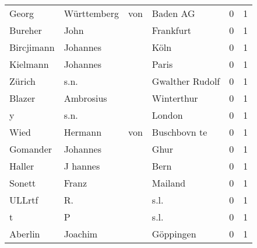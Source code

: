 \begin{center}
\begin{tiny}
\begin{longtabu}{llllrr}
                    Georg &                        Württemberg &         von &                                    Baden AG &          0 &         1 \\
                  Bureher &                               John &             &                                   Frankfurt &          0 &         1 \\
               Bircjimann &                           Johannes &             &                                        Köln &          0 &         1 \\
                 Kielmann &                           Johannes &             &                                       Paris &          0 &         1 \\
                   Zürich &                               s.n. &             &                             Gwalther Rudolf &          0 &         1 \\
                   Blazer &                          Ambrosius &             &                                  Winterthur &          0 &         1 \\
                        y &                               s.n. &             &                                      London &          0 &         1 \\
                     Wied &                            Hermann &         von &                                Buschbovn te &          0 &         1 \\
                 Gomander &                           Johannes &             &                                        Ghur &          0 &         1 \\
                   Haller &                           J hannes &             &                                        Bern &          0 &         1 \\
                   Sonett &                              Franz &             &                                     Mailand &          0 &         1 \\
                   ULLrtf &                                 R. &             &                                        s.l. &          0 &         1 \\
                        t &                                  P &             &                                        s.l. &          0 &         1 \\
                  Aberlin &                            Joachim &             &                                   Göppingen &          0 &         1 \\

\end{longtabu}
\end{tiny}
\end{center}
